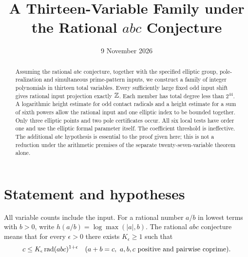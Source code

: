 \documentclass[11pt,a4paper]{article}
\title{A Thirteen-Variable Family under the Rational $abc$ Conjecture}
\author{}\date{9 November 2026}
\begin{document}
\maketitle
\begin{abstract}
Assuming the rational $abc$ conjecture, together with the specified
elliptic group, pole-realization and simultaneous prime-pattern inputs,
we construct a family of integer polynomials in thirteen total variables.
Every sufficiently large fixed odd input shift gives rational input
projection exactly $\mathbb Z$. Each member has total degree less than
$2^{44}$. A logarithmic height estimate for odd contact radicals and
a height estimate for a sum of sixth powers allow the rational input
and one elliptic index to be bounded together. Only three elliptic
points and two pole certificates occur. All six local tests have order
one and use the elliptic formal parameter itself. The coefficient
threshold is ineffective. The additional $abc$ hypothesis is essential
to the proof given here; this is not a reduction under the arithmetic
premises of the separate twenty-seven-variable theorem alone.
\end{abstract}

\section{Statement and hypotheses}

All variable counts include the input. For a rational number $a/b$
in lowest terms with $b>0$, write
$h(a/b)=\log\max(|a|,b)$.
The rational $abc$ conjecture means that for every $\epsilon>0$
there exists $K_\epsilon\ge1$ such that
\[
 c\le K_\epsilon\operatorname{rad}(abc)^{1+\epsilon}
 \quad(a+b=c,\ a,b,c\text{ positive and pairwise coprime}).
\]
\end{document}
